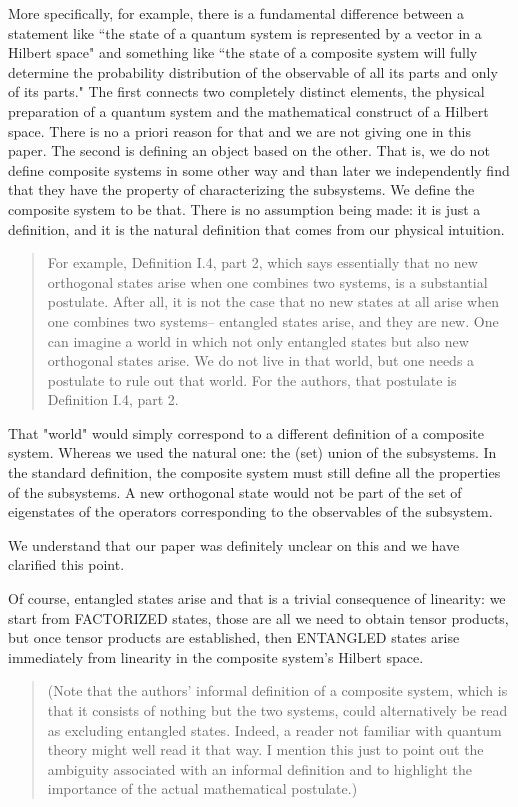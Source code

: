 \documentclass[11pt]{article}
\begin{document}
More specifically, for example, there is a fundamental difference between a statement
like ``the state of a quantum system is represented by a vector in a
Hilbert space" and something like ``the state of a composite system
will fully determine the probability distribution of the observable of
all its parts and only of its parts." The first connects two
completely distinct elements, the physical preparation of a quantum
system and the mathematical construct of a Hilbert space. There is no
a priori reason for that and we are not giving one in this paper. The
second is defining an object based on the other. That is, we do not
define composite systems in some other way and than later we
independently find that they have the property of characterizing the
subsystems.  We define the composite system to be that. There is no
assumption being made: it is just a definition, and it is the natural
definition that comes from our physical intuition.

\begin{quote} For
example, Definition I.4, part 2, which says essentially that no new
orthogonal states arise when one combines two systems, is a
substantial postulate. After all, it is not the case that no new
states at all arise when one combines two systems-- entangled states
arise, and they are new. One can imagine a world in which not only
entangled states but also new orthogonal states arise. We do not live
in that world, but one needs a postulate to rule out that world. For
the authors, that postulate is Definition I.4, part 2.
\end{quote}

That "world" would simply correspond to a different definition of a composite system. Whereas we used the natural one: the (set) union of the subsystems. 
In the standard definition, the
composite system must still define all the properties of the subsystems. A new orthogonal state would not be part of the set of eigenstates of the
operators corresponding to the observables of the subsystem.

We understand that our paper was definitely unclear on this and we have
clarified this point. 

Of course, entangled states arise and that is a
trivial consequence of linearity: we start from FACTORIZED states,
those are all we need to obtain tensor products, but once tensor
products are established, then ENTANGLED states arise immediately from
linearity in the composite system's Hilbert space.

\begin{quote}
(Note that the authors' informal definition of a composite
system, which is that it consists of nothing but the two systems,
could alternatively be read as excluding entangled states. Indeed, a
reader not familiar with quantum theory might well read it that way. I
mention this just to point out the ambiguity associated with an
informal definition and to highlight the importance of the actual
mathematical postulate.)
\end{quote}
\end{document}

